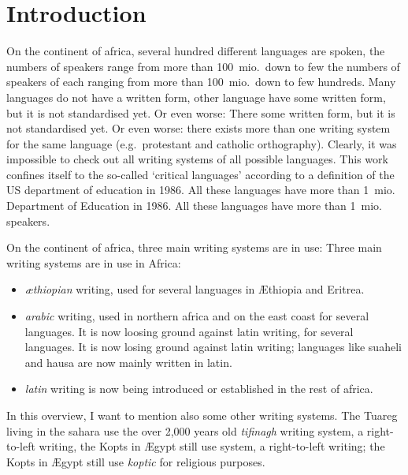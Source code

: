 {\section*{Introduction}
On the continent of africa, several hundred different languages are spoken, 
the numbers of speakers range from more than 100~mio.\ down to few 
%
the numbers of speakers of each ranging from more than 100~mio.\ down to few 
hundreds. Many languages do not have a written form, other language have 
some written form, but it is not standardised yet. Or even worse: There 
%
some written form, but it is not standardised yet. Or even worse: there 
exists more than one writing system for the same language (e.g.~protestant 
and catholic orthography). Clearly, it was impossible to check out all 
writing systems of all possible languages. This work confines itself to the 
so-called `critical languages' according to a definition of the US 
department of education in 1986. All these languages have more than 1~mio.\ %
%
Department of Education in 1986. All these languages have more than 1~mio.\ %
speakers.

On the continent of africa, three main writing systems are in use:
%
\noindent
Three main writing systems are in use in Africa:
\begin{itemize}
\item {\it {\ae}thiopian} writing, used for several languages in 
      {\AE}thiopia and Eritrea.
\item {\it arabic} writing, used in northern africa and on the east coast 
      for several languages. It is now loosing ground against latin writing,
%
      for several languages. It is now losing ground against latin writing;
      languages like suaheli and hausa are now mainly written in latin.
\item {\it latin} writing is now being introduced or established in the 
      rest of africa. 
\end{itemize}
In this overview, I want to mention also some other writing systems.
The Tuareg 
living in the sahara use the over 2,000 years old {\em tifinagh} writing 
system, a right-to-left writing, the Kopts in {\AE}gypt still use 
%
system, a right-to-left writing; the Kopts in {\AE}gypt still use 
{\em koptic} for religious purposes. 

}
